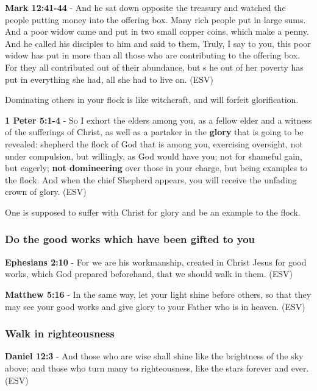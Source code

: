 \documentclass[11pt]{article}
\begin{document}
\textbf{Mark 12:41-44} - And he sat down opposite the treasury and watched the people putting money into the offering box. Many rich people put in large sums. And a poor widow came and put in two small copper coins, which make a penny. And he called his disciples to him and said to them, Truly, I say to you, this poor widow has put in more than all those who are contributing to the offering box. For they all contributed out of their abundance, but s he out of her poverty has put in everything she had, all she had to live on. (ESV)

Dominating others in your flock is like witchcraft, and will forfeit glorification.

\textbf{1 Peter 5:1-4} - So I exhort the elders among you, as a fellow elder and a witness of the sufferings of Christ, as well as a partaker in the \textbf{glory} that is going to be revealed: shepherd the flock of God that is among you, exercising oversight, not under compulsion, but willingly, as God would have you; not for shameful gain, but eagerly; \textbf{not domineering} over those in your charge, but being examples to the flock. And when the chief Shepherd appears, you will receive the unfading crown of glory. (ESV)

One is supposed to suffer with Christ for glory and be an example to the flock.

\subsubsection{Do the good works which have been gifted to you}
\label{sec:orgb69c204}
\textbf{Ephesians 2:10} - For we are his workmanship, created in Christ Jesus for good works, which God prepared beforehand, that we should walk in them. (ESV)

\textbf{Matthew 5:16} - In the same way, let your light shine before others, so that they may see your good works and give glory to your Father who is in heaven. (ESV)

\subsubsection{Walk in righteousness}
\label{sec:org39bb5e3}

\textbf{Daniel 12:3} - And those who are wise shall shine like the brightness of the sky above; and those who turn many to righteousness, like the stars forever and ever. (ESV)
\end{document}
